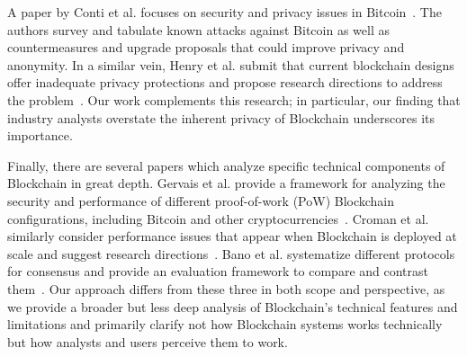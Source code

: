 A paper by Conti et al. focuses on security and privacy issues in Bitcoin~\cite{Conti17}. The authors survey and tabulate known attacks against Bitcoin as well as countermeasures and upgrade proposals that could improve privacy and anonymity. In a similar vein, Henry et al. submit that current blockchain designs offer inadequate privacy protections and propose research directions to address the problem~\cite{Henry18}. Our work complements this research; in particular, our finding that industry analysts overstate the inherent privacy of Blockchain underscores its importance. 

Finally, there are several papers which analyze specific technical components of Blockchain in great depth. Gervais et al. provide a framework for analyzing the security and performance of different proof-of-work (PoW) Blockchain configurations, including Bitcoin and other cryptocurrencies~\cite{Gervais16}. Croman et al. similarly consider performance issues that appear when Blockchain is deployed at scale and suggest research directions~\cite{Croman16}. Bano et al. systematize different protocols for consensus and provide an evaluation framework to compare and contrast them~\cite{Bano17}. %
Our approach differs from these three in both scope and perspective, as we provide a broader but less deep analysis of Blockchain's technical features and limitations and primarily clarify not how Blockchain systems works technically but how analysts and users perceive them to work.